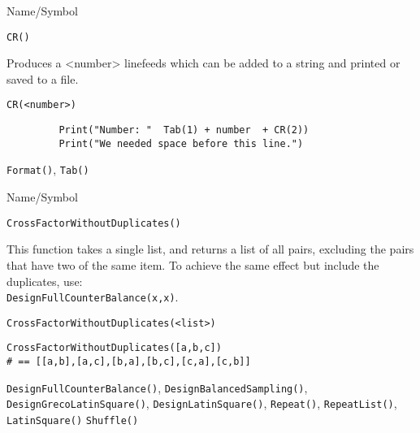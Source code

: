 \begin{desc}{Name/Symbol}

\item[Name/Symbol] \verb+CR()+

\item[Description]  Produces a <number> linefeeds which can be added to a
  string and printed or saved to a file.

\item[Usage]        \verb!CR(<number>)!

\item[Example]     
\begin{verbatim}
         Print("Number: "  Tab(1) + number  + CR(2))
         Print("We needed space before this line.")
\end{verbatim}
\item[See Also]
\verb+Format()+, \verb+Tab()+
\end{desc}



\rl


\begin{desc}{Name/Symbol}
\item[Name/Symbol]  	\verb+CrossFactorWithoutDuplicates()+

\item[Description] 	This function takes a single list, and returns a list of all 
			pairs, excluding the pairs that have two of the same item. 
			To achieve the same effect but include the duplicates, use: \\
			\verb+DesignFullCounterBalance(x,x)+.

\item[Usage]
\begin{verbatim}
CrossFactorWithoutDuplicates(<list>)
\end{verbatim}

\item[Example]
\begin{verbatim}
CrossFactorWithoutDuplicates([a,b,c]) 
# == [[a,b],[a,c],[b,a],[b,c],[c,a],[c,b]]
\end{verbatim}

\item[See Also] \verb+DesignFullCounterBalance()+,
  \verb+DesignBalancedSampling()+, \verb+DesignGrecoLatinSquare()+,
  \verb+DesignLatinSquare()+, \verb+Repeat()+, \verb+RepeatList()+, 
  \verb+LatinSquare()+ \verb+Shuffle()+
\end{desc}

